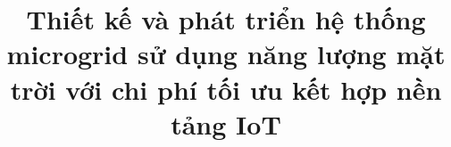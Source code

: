 \documentclass[oneside,final]{hcmut-report}
\title{Thiết kế và phát triển hệ thống microgrid sử dụng năng lượng mặt trời với chi phí tối ưu kết hợp nền tảng IoT}
\begin{document}
\coverpage%

\clearpage


\clearpage
\tableofcontents

\clearpage









\end{document}
